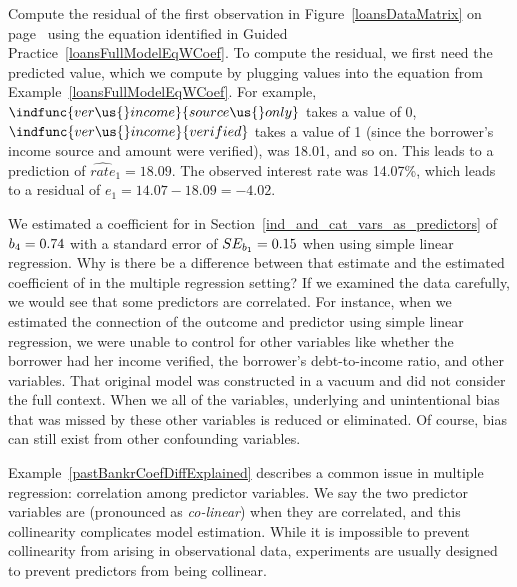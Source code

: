 \begin{examplewrap}
\begin{nexample}{Compute the residual of the first observation
    in Figure~\ref{loansDataMatrix} on
    page~\pageref{loansDataMatrix} using the equation identified
    in Guided Practice~\ref{loansFullModelEqWCoef}.}
  To compute the residual, we first need the predicted value,
  which we compute by plugging values into the equation from
  Example~\ref{loansFullModelEqWCoef}.
  For example, $\indfunc{ver\us{}income}{source\us{}only}$
  takes a value of 0,
  $\indfunc{ver\us{}income}{verified}$ takes a value of 1
  (since the borrower's income source and amount were verified),
   was 18.01, and so on.
  This leads to a prediction of $\widehat{rate}_1 = 18.09$.
  The observed interest rate was 14.07\%, which leads to
  a residual of $e_1 = 14.07 - 18.09 = -4.02$.
\end{nexample}
\end{examplewrap}

\begin{examplewrap}
\begin{nexample}{We estimated a coefficient for
     in
    Section~\ref{ind_and_cat_vars_as_predictors}
    of $b_4 = 0.74{}$ with a standard error
    of $SE_{b_1} = 0.15{}$ when using simple
    linear regression.
    Why is there be a difference between that estimate
    and the estimated coefficient of \pastbankrFullCoef{}
    in the multiple regression setting?}
  \label{pastBankrCoefDiffExplained}%
  If we examined the data carefully, we would see that
  some predictors are correlated.
  For instance, when we estimated the connection of the
  outcome  and predictor
   using simple linear regression,
  we were unable to control for other variables like
  whether the borrower had her income verified,
  the borrower's debt-to-income ratio, and other variables.
  That original model was constructed in a vacuum and did
  not consider the full context.
  When we all of the variables, underlying and unintentional
  bias that was missed by these other variables is reduced
  or eliminated.
  Of course, bias can still exist from other confounding
  variables.
\end{nexample}
\end{examplewrap}

Example~\ref{pastBankrCoefDiffExplained} describes a common
issue in multiple regression: correlation among predictor
variables.
We say the two predictor variables are 
(pronounced as \emph{co-linear}) when they are correlated,
and this collinearity complicates model estimation.
While it is impossible to prevent collinearity from arising
in observational data, experiments are usually designed to
prevent predictors from being collinear.

